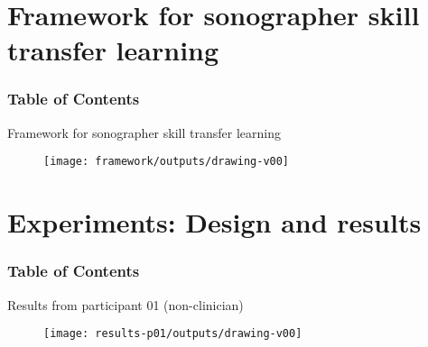 {\section{Framework for sonographer skill transfer learning}
\begin{frame}
      \frametitle{Table of Contents}
      \tableofcontents[currentsection]
\end{frame}

{

\begin{frame}{Framework for sonographer skill transfer learning}{}

      \begin{figure}
        \centering
        \texttt{[image: framework/outputs/drawing-v00]}
      \end{figure}
\end{frame}
}



\section{Experiments: Design and results}
\begin{frame}
      \frametitle{Table of Contents}
      \tableofcontents[currentsection]
  \end{frame}

{

\begin{frame}{Results from participant 01 (non-clinician)}{}

      \begin{figure}
        \centering
        \texttt{[image: results-p01/outputs/drawing-v00]}
      \end{figure}
\end{frame}
}


{

}}
